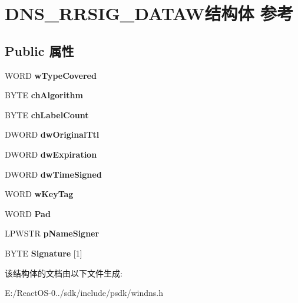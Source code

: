 \hypertarget{struct_d_n_s___r_r_s_i_g___d_a_t_a_w}{}\section{D\+N\+S\+\_\+\+R\+R\+S\+I\+G\+\_\+\+D\+A\+T\+A\+W结构体 参考}
\label{struct_d_n_s___r_r_s_i_g___d_a_t_a_w}
\subsection*{Public 属性}
\begin{DoxyCompactItemize}
\item 
\mbox{\label{struct_d_n_s___r_r_s_i_g___d_a_t_a_w_a69cc479948050d7b776604db450de3bf}} 
W\+O\+RD {\bfseries w\+Type\+Covered}
\item 
\mbox{\label{struct_d_n_s___r_r_s_i_g___d_a_t_a_w_ab2012eff3ce6d278d368efa46a896570}} 
B\+Y\+TE {\bfseries ch\+Algorithm}
\item 
\mbox{\label{struct_d_n_s___r_r_s_i_g___d_a_t_a_w_a28536a3319f25a0e972d8c42df640865}} 
B\+Y\+TE {\bfseries ch\+Label\+Count}
\item 
\mbox{\label{struct_d_n_s___r_r_s_i_g___d_a_t_a_w_aea1228d7c01c810b83432501a8ca29d6}} 
D\+W\+O\+RD {\bfseries dw\+Original\+Ttl}
\item 
\mbox{\label{struct_d_n_s___r_r_s_i_g___d_a_t_a_w_abe352c5fce93cc3a618e11401be9ff86}} 
D\+W\+O\+RD {\bfseries dw\+Expiration}
\item 
\mbox{\label{struct_d_n_s___r_r_s_i_g___d_a_t_a_w_aac7ee8ba00663e8f4aa203bd2f9093a8}} 
D\+W\+O\+RD {\bfseries dw\+Time\+Signed}
\item 
\mbox{\label{struct_d_n_s___r_r_s_i_g___d_a_t_a_w_aa8f2a60d82b2776c3023582e28228857}} 
W\+O\+RD {\bfseries w\+Key\+Tag}
\item 
\mbox{\label{struct_d_n_s___r_r_s_i_g___d_a_t_a_w_ad51cefb03684d5832e240bf638e6e6a4}} 
W\+O\+RD {\bfseries Pad}
\item 
\mbox{\label{struct_d_n_s___r_r_s_i_g___d_a_t_a_w_af22cc0229a33ca9b10242ce05118cd33}} 
L\+P\+W\+S\+TR {\bfseries p\+Name\+Signer}
\item 
\mbox{\label{struct_d_n_s___r_r_s_i_g___d_a_t_a_w_a358b1007bf8156dc20523069b81c256e}} 
B\+Y\+TE {\bfseries Signature} \mbox{[}1\mbox{]}
\end{DoxyCompactItemize}


该结构体的文档由以下文件生成\+:\begin{DoxyCompactItemize}
\item 
E\+:/\+React\+O\+S-\/0../sdk/include/psdk/windns.\+h\end{DoxyCompactItemize}
